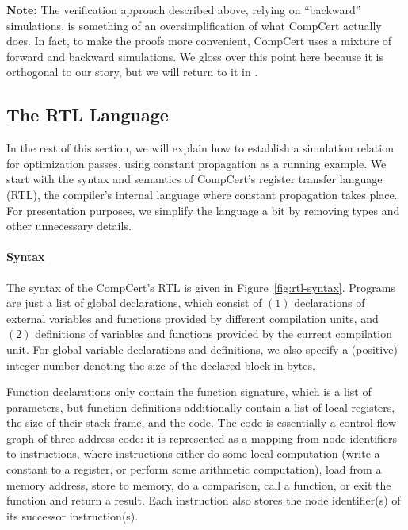 \textbf{Note:} The verification approach described above, relying on ``backward'' simulations, is
something of an oversimplification of what CompCert actually does.  In fact, to make the proofs more
convenient, CompCert uses a mixture of forward and backward simulations.  We gloss over this point
here because it is orthogonal to our story, but we will return to it in .




\subsection{The RTL Language}
\label{sec:background:rtl}



In the rest of this section, we will explain how to establish a simulation relation for optimization
passes, using constant propagation as a running example.  We start with the syntax and semantics of
CompCert's register transfer language (RTL), the compiler's internal language where constant
propagation takes place.  For presentation purposes, we simplify the language a bit by removing
types and other unnecessary details.


\paragraph{Syntax}

% 

The syntax of the CompCert's RTL is given in Figure~\ref{fig:rtl-syntax}.  Programs are just a list
of global declarations, which consist of $(1)$ declarations of external variables and functions
provided by different compilation units, and $(2)$ definitions of variables and functions provided
by the current compilation unit.  For global variable declarations and definitions, we also specify
a (positive) integer number denoting the size of the declared block in bytes.

Function declarations only contain the function signature, which is a list of parameters, but
function definitions additionally contain a list of local registers, the size of their stack frame,
and the code.  The code is essentially a control-flow graph of three-address code: it is represented
as a mapping from node identifiers to instructions, where instructions either
%
do some local computation (\eg write a constant to a register, or perform some arithmetic
computation),
%
load from a memory address, 
%
store to memory,
%
do a comparison,
%
call a function, 
%
or exit the function and return a result. 
%
Each instruction also stores the node identifier(s) of its successor instruction(s).

